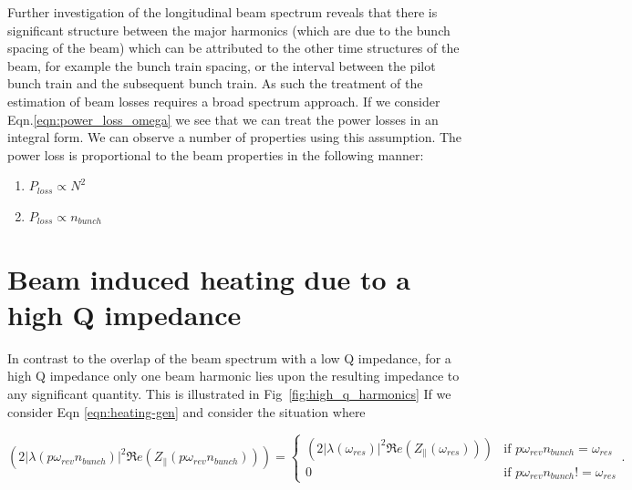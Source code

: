 \documentclass[12pt,a4paper,twopage,openright]{report}
\begin{document}
Further investigation of the longitudinal beam spectrum reveals that there is significant structure between the major harmonics (which are due to the bunch spacing of the beam) which can be attributed to the other time structures of the beam, for example the bunch train spacing, or the interval between the pilot bunch train and the subsequent bunch train. As such the treatment of the estimation of beam losses requires a broad spectrum approach. If we consider Eqn.\ref{eqn:power_loss_omega} we see that we can treat the power losses in an integral form. We can observe a number of properties using this assumption. The power loss is proportional to the beam properties in the following manner:

\begin{enumerate}
\item{$P_{loss} \propto N^{2}$}
\item{$P_{loss} \propto n_{bunch}$}
\end{enumerate}

\section{Beam induced heating due to a high Q impedance}

In contrast to the overlap of the beam spectrum with a low Q impedance, for a high Q impedance only one beam harmonic lies upon the resulting impedance to any significant quantity. This is illustrated in Fig~\ref{fig:high_q_harmonics} If we consider Eqn \ref{eqn:heating-gen} and consider the situation where

\begin{equation}
\left( 2 \left| \lambda \left(p \omega_{rev}n_{bunch} \right)  \right|^{2}  \Re{}e \left( Z_{\parallel} \left(p \omega_{rev}n_{bunch}\right) \right) \right) = 
\begin{cases}
\left( 2 \left| \lambda \left( \omega_{res} \right)  \right|^{2}  \Re{}e \left( Z_{\parallel} \left( \omega_{res} \right) \right) \right) &\textrm{if $p \omega_{rev} n_{bunch} = \omega_{res}$}\\
0								&\textrm{if $p \omega_{rev} n_{bunch} != \omega_{res}$}
\end{cases}
\label{eqn:single_harmonic_profile}.
\end{equation}
\end{document}
